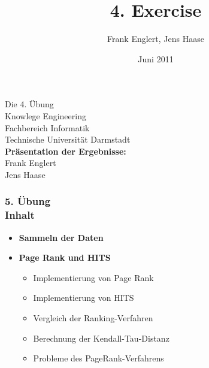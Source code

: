\documentclass[accentcolor=tud1b,colorbacktitle,inverttitle,landscape,presentation,t]{tudbeamer}
\newcommand{\myframetitle}[2]{\frametitle{#1 \\[.2cm] \small #2}}
\newcommand{\fatitem}[1]{\item \textbf{#1}}
\begin{document}
\title[MGA]{\large 4. Exercise}

\author{Frank Englert, Jens Haase}


\date{Juni 2011}

\begin{titleframe}
\begin{center}
\color{tudtextaccent} \large Die 4. Übung\\[.5cm]
\normalcolor \normalsize Knowlege Engineering \\
Fachbereich Informatik \\
Technische Universität Darmstadt\\[.5cm]

\textbf{Präsentation der Ergebnisse:}\\
Frank Englert\\ 
Jens Haase
\end{center}

\end{titleframe}  

\begin{frame}[c]
	\myframetitle{5. Übung}{Inhalt}
\begin{itemize}
  \fatitem{Sammeln der Daten}
  \fatitem{Page Rank und HITS}
  \begin{itemize}
  \item Implementierung von Page Rank
  \item Implementierung von HITS
  \item Vergleich der Ranking-Verfahren
  \item Berechnung der Kendall-Tau-Distanz
  \item Probleme des PageRank-Verfahrens
\end{itemize} 
\end{itemize} 
\end{frame}









\end{document}
